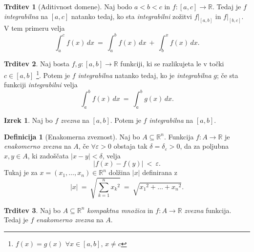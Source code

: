 \documentclass[11pt]{article}
\theoremstyle{definition}
\newtheorem{definicija}{Definicija}[section]
\theoremstyle{definition}
\newtheorem{trditev}{Trditev}[section]
\theoremstyle{definition}
\newtheorem{izrek}{Izrek}[section]
\theoremstyle{theorem}
\begin{document}
\begin{trditev}[Aditivnost domene]

Naj bodo $a < b < c$ in $f:[a, c] \rightarrow \mathbb{R}$. Tedaj je $f$ \textit{integrabilna} na $[a, c]$ natanko tedaj, ko sta \textit{integrabilni} zožitvi $f |_{[a, b]}$ in $f |_{[b, c]}$. V tem primeru velja
$$\int_a^c f(x)\,dx ~=~ \int_a^b f(x)\,dx ~+~ \int_b^x f(x)\,dx.$$

\end{trditev}
\vspace{0.5cm}

\begin{trditev}

Naj bosta  $f, g: [a, b] \rightarrow \mathbb{R}$ funkciji, ki se razlikujeta le v točki $c \in [a, b]$ \footnote{$f(x) = g(x)$ $\forall x \in [a, b]$, $x \neq c$}. Potem je $f$ \textit{integrabilna} natanko tedaj, ko je \textit{integrabilna} $g$; če sta funkciji \textit{integrabilni} velja
$$\int_a^b f(x)\,dx ~=~ \int_a^b g(x)\,dx.$$
 
\end{trditev}
\vspace{0.5cm}

\begin{izrek}

Naj bo $f$ \textit{zvezna} na $[a, b]$. Potem je $f$ \textit{integrabilna} na $[a, b]$.

\end{izrek}
\vspace{0.5cm}

\begin{definicija}[Enakomerna zveznost]

Naj bo $A \subseteq \mathbb{R}^n$. Funkcija $f: A \rightarrow \mathbb{R}$ je \textit{enakomerno zvezna} na $A$, če $\forall \varepsilon > 0$ obstaja tak $\delta = \delta_\varepsilon > 0$, da za poljubna $x, y \in A$, ki zadoščata $|x-y| < \delta$, velja
$$|f(x) - f(y)| ~<~ \varepsilon.$$ 
Tukaj je za $x = (x_1, \ldots, x_n) \in \mathbb{R}^n$ dolžina $|x|$ definirana z
$$|x| ~=~ \sqrt{\sum_{k=1}^n {x_k}^2} ~=~ \sqrt{{x_1}^2 + \ldots + {x_n}^2}.$$

\end{definicija}
\vspace{0.5cm}

\begin{trditev}

Naj bo $A \subseteq \mathbb{R}^n$ \textit{kompaktna množica} in $f: A \rightarrow \mathbb{R}$ \textit{zvezna} funkcija. Tedaj je $f$ \textit{enakomerno zvezna} na $A$.

\end{trditev}
\vspace{0.5cm}
\end{document}
